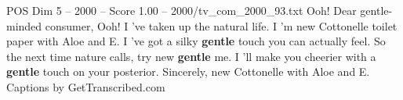 \begin{textsample}{POS Dim 5 – 2000 – Score 1.00 – 2000/tv\_com\_2000\_93.txt}  \label{ex:f5_pos_061}
Ooh!
Dear gentle-minded consumer, Ooh!
I 've taken up the natural life.
I 'm new Cottonelle toilet paper with Aloe and E.
I 've got a silky \textbf{gentle} touch you can actually feel.
So the next time nature calls, try new \textbf{gentle} me.
I 'll make you cheerier with a \textbf{gentle} touch on your posterior.
Sincerely, new Cottonelle with Aloe and E.
Captions by GetTranscribed.com

\end{textsample}
